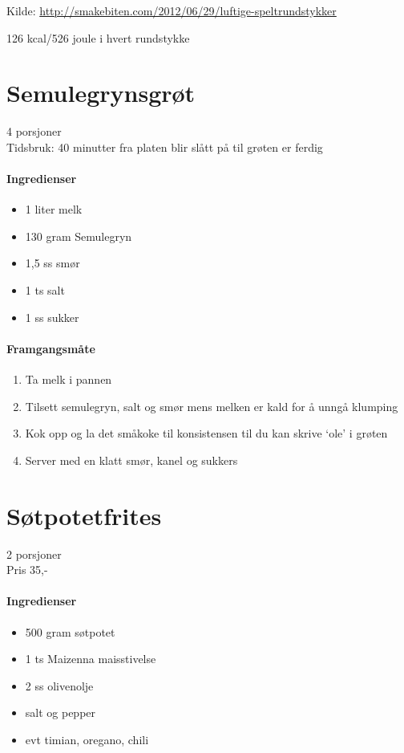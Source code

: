 \documentclass[12pt,a4paper]{book}
\begin{document}
Kilde: \url{http://smakebiten.com/2012/06/29/luftige-speltrundstykker}


126 kcal/526 joule i hvert rundstykke
\clearpage{}
\clearpage{}\section{﻿Semulegrynsgrøt}
4 porsjoner\\
Tidsbruk: 40 minutter fra platen blir slått på til grøten er ferdig

\paragraph{Ingredienser}
\begin{itemize}[noitemsep]
	\item 1 liter melk
	\item 130 gram Semulegryn
	\item 1,5 ss smør
	\item 1 ts salt
	\item 1 ss sukker
\end{itemize}

\paragraph{Framgangsmåte}
\begin{enumerate}[noitemsep]
	\item Ta melk i pannen
	\item Tilsett semulegryn, salt og smør mens melken er kald for å unngå klumping
	\item Kok opp og la det småkoke til konsistensen til du kan skrive `ole' i grøten
	\item Server med en klatt smør, kanel og sukkers
\end{enumerate}
\clearpage{}
\clearpage{}\section{﻿Søtpotetfrites}
\label{frites}

2 porsjoner\\
Pris 35,-

\paragraph{Ingredienser}
\begin{itemize}[noitemsep]
	\item 500 gram søtpotet
	\item 1 ts Maizenna maisstivelse
	\item 2 ss olivenolje
	\item salt og pepper
	\item evt timian, oregano, chili
\end{itemize}
\end{document}
